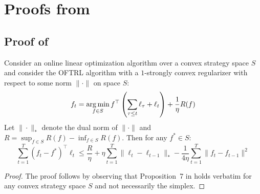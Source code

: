 \section{Proofs from }

\subsection{Proof of }

\begin{proposition}
Consider an online linear optimization algorithm over a convex strategy space $S$ and consider the OFTRL algorithm with a $1$-strongly convex regularizer with respect to some norm $\|\cdot\|$ on space $S$:
\begin{equation}
    f_t = \operatorname*{arg\,min}_{f \in S} f^\top \left(\sum_{\tau\leq t} \ell_{\tau} + \ell_t\right) + \frac{1}{\eta} R(f)
\end{equation}
Let $\|\cdot\|_*$ denote the dual norm of $\|\cdot\|$ and $R=\sup_{f\in S} R(f) - \inf_{f\in S} R(f)$. Then for any $f^*\in S$:
\begin{equation}
    \sum_{t=1}^T (f_t-f^*)^\top \ell_t \leq \frac{R}{\eta} + \eta \sum_{t=1}^T \|\ell_t - \ell_{t-1}\|_* - \frac{1}{4\eta} \sum_{t=1}^T \|f_t - f_{t-1}\|^2
\end{equation}
\end{proposition}
\begin{proof}
The proof follows by observing that Proposition~7 in \cite{syrgkanis2015fast} holds verbatim for any convex strategy space $S$ and not necessarily the simplex.
\end{proof}

